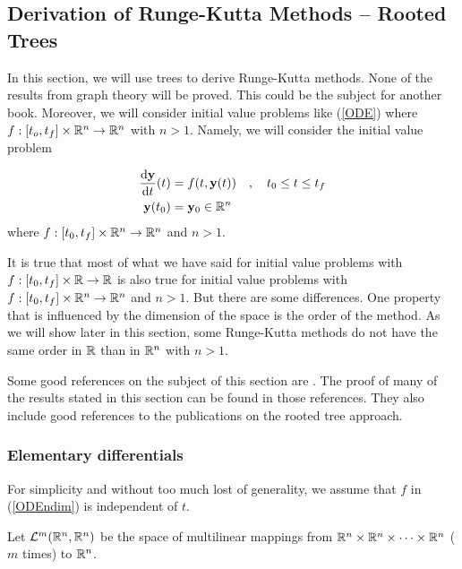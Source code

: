 \subsection{Derivation of Runge-Kutta Methods -- Rooted Trees}

In this section, we will use trees to derive Runge-Kutta methods.
None of the results from graph theory will be proved.  This could be
the subject for another book.   Moreover, we will consider initial
value problems like (\ref{ODE}) where
$f:[t_o,t_f]\times \mathbb{R}^n \to \mathbb{R}^n$ with $n>1$.  Namely, we will
consider the initial value problem

\begin{equation} \label{ODEndim}
\begin{split}
\frac{\mathrm{d}\mathbf{y}}{\mathrm{d}{t}}(t) &= f(t,\mathbf{y}(t)) \quad,
\quad t_0 \leq t \leq t_f \\
\mathbf{y}(t_0) & = \mathbf{y}_0 \in \mathbb{R}^n
\end{split}
\end{equation}
where $f:[t_0,t_f]\times\mathbb{R}^n \rightarrow \mathbb{R}^n$ and $n>1$.

It is true that most of what we have said for initial value problems
with $f:[t_0,t_f]\times \mathbb{R} \to \mathbb{R}$ is also true for initial value
problems with $f:[t_0,t_f]\times \mathbb{R}^n \to \mathbb{R}^n$ and $n>1$.  But there
are some differences.  One property that is influenced by the
dimension of the space is the order of the method.  As we will show
later in this section, some Runge-Kutta methods do not have the same
order in $\mathbb{R}$ than in $\mathbb{R}^n$ with $n>1$.

Some good references on the subject of this section are
\cite{B,I,La,Lb}.  The proof of many of the results stated in this
section can be found in those references.  They also include good
references to the publications on the rooted tree approach. 

\subsubsection{Elementary differentials}

For simplicity and without too much lost of generality, we assume that
$f$ in (\ref{ODEndim}) is independent of $t$.

Let $\mathcal{L}^{m}(\mathbb{R}^n,\mathbb{R}^n)$ be the space of multilinear mappings from
$\mathbb{R}^n \times \mathbb{R}^n \times \cdots \times \mathbb{R}^n$ ($m$ times) to $\mathbb{R}^n$.

